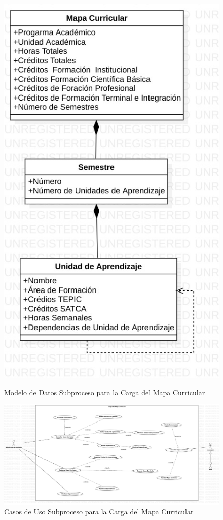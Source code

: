\begin{figure}[htbp]
    \begin{center}
        \includegraphics[width=.50\textwidth]{C2-DR/SP4/Image/ModeloDeDatosMC}
        \label{MD-SP4}
        \caption{Modelo de Datos Subproceso para la  Carga del Mapa Curricular}
    \end{center}
\end{figure}

\begin{figure}[htbp]
	\begin{center}
		\includegraphics[width=.95\textwidth]{C2-DR/SP4/Image/CasosDeUso}
		\caption{Casos de Uso Subproceso para la  Carga del Mapa Curricular}
		\label{CU-SP4}
	\end{center}
\end{figure}

